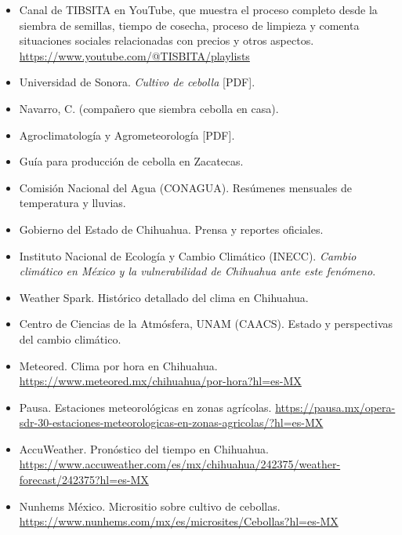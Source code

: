 \documentclass[12pt]{article}
\begin{document}
{{{{{{{{{{{	\begin{itemize}
		\item Canal de TIBSITA en YouTube, que muestra el proceso completo desde la siembra de semillas, tiempo de cosecha, proceso de limpieza y comenta situaciones sociales relacionadas con precios y otros aspectos.  
		\url{https://www.youtube.com/@TISBITA/playlists}
		
		\item Universidad de Sonora. \textit{Cultivo de cebolla} [PDF].
		
		\item Navarro, C. (compañero que siembra cebolla en casa).
		
		\item Agroclimatología y Agrometeorología [PDF].
		
		\item Guía para producción de cebolla en Zacatecas.
		
		\item Comisión Nacional del Agua (CONAGUA). Resúmenes mensuales de temperatura y lluvias.
		
		\item Gobierno del Estado de Chihuahua. Prensa y reportes oficiales.
		
		\item Instituto Nacional de Ecología y Cambio Climático (INECC). \textit{Cambio climático en México y la vulnerabilidad de Chihuahua ante este fenómeno}.
		
		\item Weather Spark. Histórico detallado del clima en Chihuahua.
		
		\item Centro de Ciencias de la Atmósfera, UNAM (CAACS). Estado y perspectivas del cambio climático.
		
		\item Meteored. Clima por hora en Chihuahua.  
		\url{https://www.meteored.mx/chihuahua/por-hora?hl=es-MX}
		
		\item Pausa. Estaciones meteorológicas en zonas agrícolas.  
		\url{https://pausa.mx/opera-sdr-30-estaciones-meteorologicas-en-zonas-agricolas/?hl=es-MX}
		
		\item AccuWeather. Pronóstico del tiempo en Chihuahua.  
		\url{https://www.accuweather.com/es/mx/chihuahua/242375/weather-forecast/242375?hl=es-MX}
		
		\item Nunhems México. Micrositio sobre cultivo de cebollas.  
		\url{https://www.nunhems.com/mx/es/microsites/Cebollas?hl=es-MX}
		

\end{itemize}}}}}}}}}}}}
\end{document}
